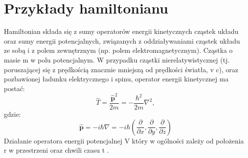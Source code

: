 \documentclass{article}
\begin{document}
\section{Przykłady hamiltonianu}
Hamiltonian składa się z sumy operatorów energii kinetycznych cząstek układu oraz sumy energii potencjalnych, związanych z oddziaływaniami cząstek układu ze sobą i z polem zewnętrznym (np. polem elektromagnetycznym).
Cząstka o masie m w polu potencjalnym.
W przypadku cząstki nierelatywistycznej (tj. poruszającej się z prędkością znacznie mniejszą od prędkości światła, v c), oraz pozbawionej ładunku elektrycznego i spinu, operator energii kinetycznej ma postać: 
$${ {\hat {T}}={\frac {{\hat {\mathbf {p} }}^{2}}{2m}}=-{\frac {\hbar ^{2}}{2m}}\nabla ^{2},}$$
gdzie:
$${ {\hat {\mathbf {p} }}=-i\hbar \nabla =-i\hbar \left({\frac {\partial }{\partial x}},{\frac {\partial }{\partial y}},{\frac {\partial }{\partial z}}\right)}$$
Działanie operatora energii potencjalnej V który w ogólności zależy od położenia r w przestrzeni oraz chwili czasu t . 
\end{document}
